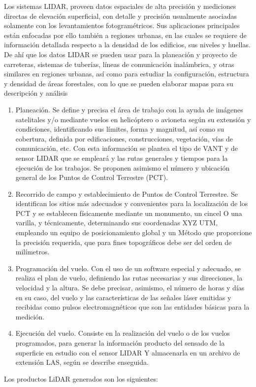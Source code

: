     Los sistemas LIDAR, proveen datos espaciales de alta precisión y mediciones directas de elevación superficial, con detalle y precisión usualmente asociadas solamente con los levantamientos fotogramétricos. Sus aplicaciones principales están enfocadas por ello también a regiones urbanas, en las cuales se requiere de información detallada respecto a la densidad de los edificios, sus niveles y huellas. De ahí que los datos LIDAR se pueden usar para la planeación y proyecto de carreteras, sistemas de tuberías, líneas de comunicación inalámbrica, y otras similares en regiones urbanas, así como para estudiar la configuración, estructura y densidad de áreas forestales, con lo que se pueden elaborar mapas para su descripción y análisis

\begin{enumerate}
    \item Planeación. Se define y precisa el área de trabajo con la ayuda de imágenes satelitales y/o mediante vuelos en helicóptero o avioneta según su extensión y condiciones, identificando sus límites, forma y magnitud, así como su cobertura, definida por edificaciones, construcciones, vegetación, vías de comunicación, etc. Con esta información se plantea el tipo de VANT y de sensor LIDAR que se empleará y las rutas generales y tiempos para la ejecución de los trabajos. Se proponen asimismo el número y ubicación general de los Puntos de Control Terrestre (PCT).
    \item Recorrido de campo y establecimiento de Puntos de Control Terrestre. Se identifican los sitios más adecuados y convenientes para la localización de los PCT y se establecen físicamente mediante un monumento, un cincel O una varilla, y técnicamente, determinando sus coordenadas XYZ UTM, empleando un equipo de posicionamiento global y un Método que proporcione la precisión requerida, que para fines topográficos debe ser del orden de milímetros.
    \item Programación del vuelo. Con el uso de un software especial y adecuado, se realiza el plan de vuelo, definiendo las rutas necesarias y sus direcciones, la velocidad y la altura. Se debe precisar, asimismo, el número de horas y días en su caso, del vuelo y las características de las señales láser emitidas y recibidas como pulsos electromagnéticos que son las entidades básicas para la medición.
    \item Ejecución del vuelo. Consiste en la realización del vuelo o de los vuelos programados, para generar la información producto del sensado de la superficie en estudio con el sensor LIDAR Y almacenarla en un archivo de extensión LAS, según se describe enseguida.
\end{enumerate}
Los productos LiDAR generados son los siguientes:

